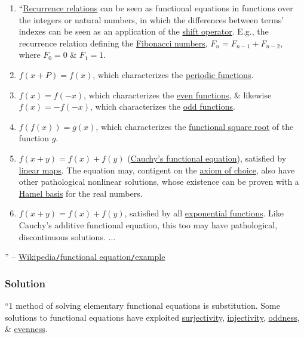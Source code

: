 \documentclass{article}
\begin{document}
\begin{enumerate}
	\item ``\href{https://en.wikipedia.org/wiki/Recurrence_relation}{Recurrence relations} can be seen as functional equations in functions over the integers or natural numbers, in which the differences between terms' indexes can be seen as an application of the \href{https://en.wikipedia.org/wiki/Shift_operator}{shift operator}. E.g., the recurrence relation defining the \href{https://en.wikipedia.org/wiki/Fibonacci_numbers}{Fibonacci numbers}, $F_n = F_{n-1} + F_{n-2}$, where $F_0 = 0$ \& $F_1 = 1$.
	\item $f(x + P) = f(x)$, which characterizes the \href{https://en.wikipedia.org/wiki/Periodic_function}{periodic functions}.
	\item $f(x) = f(-x)$, which characterizes the \href{https://en.wikipedia.org/wiki/Even_function}{even functions}, \& likewise $f(x) = -f(-x)$, which characterizes the \href{https://en.wikipedia.org/wiki/Odd_function}{odd functions}.
	\item $f(f(x)) = g(x)$, which characterizes the \href{https://en.wikipedia.org/wiki/Functional_square_root}{functional square root} of the function $g$.
	\item $f(x + y) = f(x) + f(y)$ (\href{https://en.wikipedia.org/wiki/Cauchy%27s_functional_equation}{Cauchy's functional equation}), satisfied by \href{https://en.wikipedia.org/wiki/Linear_map}{linear maps}. The equation may, contigent on the \href{https://en.wikipedia.org/wiki/Axiom_of_choice}{axiom of choice}, also have other pathological nonlinear solutions, whose existence can be proven with a \href{https://en.wikipedia.org/wiki/Hamel_basis}{Hamel basis} for the real numbers.
	\item $f(x + y) = f(x) + f(y)$, satisfied by all \href{https://en.wikipedia.org/wiki/Exponential_function}{exponential functions}. Like Cauchy's additive functional equation, this too may have pathological, discontinuous solutions. $\ldots$
\end{enumerate}
'' -- \href{https://en.wikipedia.org/wiki/Functional_equation#Examples}{Wikipedia\texttt{/}functional equation\texttt{/}example}

\subsubsection{Solution}
``1 method of solving elementary functional equations is substitution. Some solutions to functional equations have exploited \href{https://en.wikipedia.org/wiki/Surjective}{surjectivity}, \href{https://en.wikipedia.org/wiki/Injective_function}{injectivity}, \href{https://en.wikipedia.org/wiki/Odd_function}{oddness}, \& \href{https://en.wikipedia.org/wiki/Even_function}{evenness}.
\end{document}

